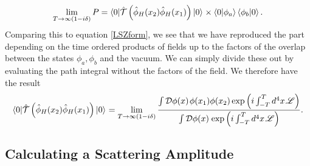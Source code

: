 \begin{equation}
\lim_{T \to \infty(1- i \delta)} P = \mathinner{\langle0\vert \hat{\mathcal{T}} \left(\hat{\phi}_H(x_2) \hat{\phi}_H(x_1) \right)\vert0\rangle}_{} \times \left<0 | \phi_a \right>\left<\phi_b | 0 \right>. 
\end{equation}
Comparing this to equation \ref{LSZform}, we see that we have reproduced the part depending on the time ordered products of fields up to the factors of the overlap between the states $\phi_a, \phi_b$ and the vacuum. We can simply divide these out by evaluating the path integral without the factors of the field. We therefore have the result
\begin{equation}
 \mathinner{\langle0\vert \hat{\mathcal{T}} \left(\hat{\phi}_H(x_2) \hat{\phi}_H(x_1) \right)\vert0\rangle}_{} = \lim_{T \to \infty(1 - i \delta)} \frac{\int  \mathcal{D} \phi(x) \hspace{1pt}  \phi(x_1) \phi(x_2) \exp \left( i \int_{-T}^T d^4 x \hspace{1pt} \mathscr{L} \right)}{\int  \mathcal{D} \phi(x) \hspace{1pt} \exp \left( i \int_{-T}^T d^4 x \hspace{1pt} \mathscr{L} \right)}.
\end{equation}

\subsection{Calculating a Scattering Amplitude}

